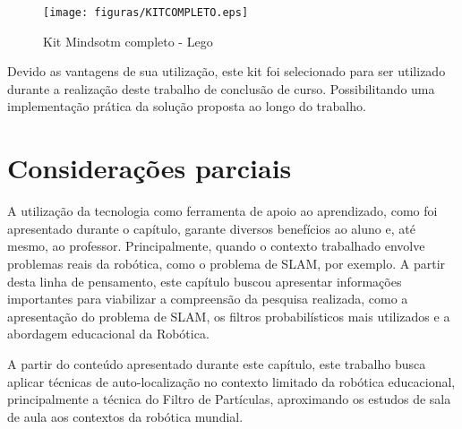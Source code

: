 \begin{figure}[H]
	\centering
	\texttt{[image: figuras/KITCOMPLETO.eps]}
	\caption[Kit Mindsotm completo - Lego]{Kit Mindsotm completo - Lego}
	\label{img:kit}
\end{figure}

Devido as vantagens de sua utilização, este kit foi selecionado para ser utilizado durante a realização deste trabalho de conclusão de curso. Possibilitando uma implementação prática da solução proposta ao longo do trabalho.


\section{Considerações parciais} %
\label{sec:considerações_parciais}

	A utilização da tecnologia como ferramenta de apoio ao aprendizado, como foi apresentado durante o capítulo, garante diversos benefícios ao aluno e, até mesmo, ao professor. Principalmente, quando o contexto trabalhado envolve problemas reais da robótica, como o problema de SLAM, por exemplo. A partir desta linha de pensamento, este capítulo buscou apresentar informações importantes para viabilizar a compreensão da pesquisa realizada, como a apresentação do problema de SLAM, os filtros probabilísticos mais utilizados e a abordagem educacional da Robótica.

	A partir do conteúdo apresentado durante este capítulo, este trabalho busca aplicar técnicas de auto-localização no contexto limitado da robótica educacional, principalmente a técnica do Filtro de Partículas, aproximando os estudos de sala de aula aos contextos da robótica mundial.

